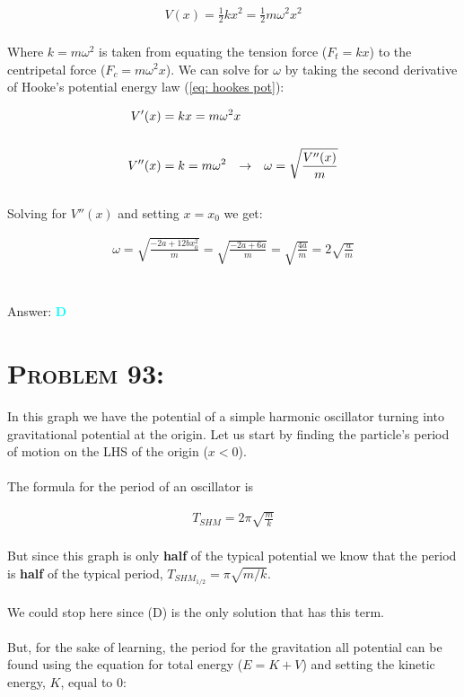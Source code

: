 \documentclass{article}
\begin{document}
\begin{gather}
\label{eq: hookes pot} V(x) = \frac{1}{2} kx^{2} =   \frac{1}{2} m \omega^{2} x^{2}
\end{gather}
\\
Where $k = m \omega^{2}$ is taken from equating the tension force ($F_{t} = kx$) to the centripetal force ($F_{c} = m\omega^{2}x$). We can solve for $\omega$ by taking the second derivative of Hooke's potential energy law (\ref{eq: hookes pot}):

\begin{align}
V'(x) &= kx =  m \omega^{2} x\nonumber\\
\nonumber\\
V''(x) &= k =  m \omega^{2} \hspace{.1in} \rightarrow \hspace{.1in} \omega = \sqrt{ \frac{V''(x)} {m} } \nonumber
\end{align}
\\
Solving for $V''(x)$ and setting $x=x_{0}$ we get:

\begin{gather}
\omega = \sqrt{ \frac{-2a + 12bx_{0}^{2}} {m} } =  \sqrt{ \frac{-2a + 6a } {m} } = \sqrt{ \frac{ 4a } {m} } = \boxed{2\sqrt{\frac{a}{m}}}\nonumber
\end{gather}
\\\\
Answer: \textbf{\textcolor{cyan}D}\\


\section{\textsc{Problem 93:}} 

In this graph we have the potential of a simple harmonic oscillator turning into gravitational potential at the origin. Let us start by finding the particle's period of motion on the LHS of the origin ($x<0$).\\
\\
The formula for the period of an oscillator is 

\begin{gather}
T_{SHM} = 2 \pi \sqrt{\frac{m}{k}}
\end{gather}
\\
But since this graph is only \textbf{half} of the typical potential we know that the period is \textbf{half} of the typical period, $T_{SHM_{1/2}} = \pi \sqrt{m/k}$.\\
\\
We could stop here since (D) is the only solution that has this term. \\
\\
But, for the sake of learning, the period for the gravitation all potential can be found using the equation for total energy ($E = K + V$) and setting the kinetic energy, $K$, equal to $0$:
\end{document}
